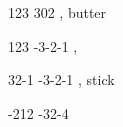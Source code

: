 \documentclass[a4paper,openany]{book}
\begin{document}
\begin{multicols}{2}
%
  {{1}{2}{3}}%
  {{3}{0}{2}}%
  {
    \setcounter{Wyldcrafting}{1}
    \setcounter{Fire}{1}
    \setcounter{Air}{3}
  }%
  {\adrenalinesurge, \mightydraw}%
  {butter}%
  {}%

\showStdSpells

\toggletrue{examplecharacter}

%
  {{1}{2}{3}}%
  {{-3}{-2}{-1}}%
  {
    \setcounter{Academics}{1}
    \longsword
    \partialleather
  }
  {\adrenalinesurge, \mightydraw}
  {\rations}%
  {}%


%
  {{3}{2}{-1}}%
  {{-3}{-2}{-1}}%
  {
    \setcounter{Xenomology}{1}
    \spear
    \completeplate
  }%
  {\adrenalinesurge, \mightydraw}
  {stick}%
  {}%

\togglefalse{examplecharacter}


%
  {{-2}{1}{2}}%
  {{-3}{2}{-4}}%
  {
    \setcounter{Xenomology}{1}
    \setcounter{Projectiles}{2}
    \javelin
  }%
  {}
  {\lootGoblin}%
  {
    \tentacles
    \web
  }%

\end{multicols}
\end{document}
